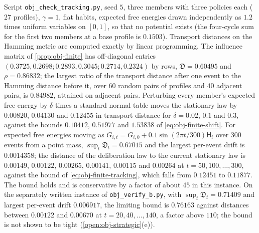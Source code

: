 \begin{numcheck}\label{chk:obj-finite}
Script \texttt{obj\_\allowbreak check\_\allowbreak tracking.py}, seed $5$, three members with three policies each ($27$ profiles), $\gamma=1$, flat habits, expected free energies drawn independently as $1.2$ times uniform variables on $[0,1]$, so that no potential exists (the four-cycle sum for the first two members at a base profile is $0.1503$). Transport distances on the Hamming metric are computed exactly by linear programming. The influence matrix of \cref{prop:obj-finite} has off-diagonal entries $(0.3725,0.2698;0.2893,0.3045;0.2714,0.2324)$ by rows, $\mathfrak D=0.60495$ and $\rho=0.86832$; the largest ratio of the transport distance after one event to the Hamming distance before it, over $60$ random pairs of profiles and $40$ adjacent pairs, is $0.84982$, attained on adjacent pairs. Perturbing every member's expected free energy by $\delta$ times a standard normal table moves the stationary law by $0.00820$, $0.04130$ and $0.12455$ in transport distance for $\delta=0.02$, $0.1$ and $0.3$, against the bounds $0.10412$, $0.51977$ and $1.53838$ of \eqref{eq:obj-finite-shift}. For expected free energies moving as $G_{i,t}=G_{i,0}+0.1\sin(2\pi t/300)\mathsf H_i$ over $300$ events from a point mass, $\sup_t\mathfrak D_t=0.67015$ and the largest per-event drift is $0.0014358$; the distance of the deliberation law to the current stationary law is $0.00149$, $0.00122$, $0.00265$, $0.00141$, $0.00115$ and $0.00264$ at $t=50,100,\dots,300$, against the bound of \eqref{eq:obj-finite-tracking}, which falls from $0.12451$ to $0.11877$. The bound holds and is conservative by a factor of about $45$ in this instance. On the separately written instance of \texttt{obj\_\allowbreak verify\_\allowbreak b.py}, with $\sup_t\mathfrak D_t=0.71409$ and largest per-event drift $0.006917$, the limiting bound is $0.76163$ against distances between $0.00122$ and $0.00670$ at $t=20,40,\dots,140$, a factor above $110$; the bound is not shown to be tight (\cref{open:obj-strategic}(e)).
\end{numcheck}

